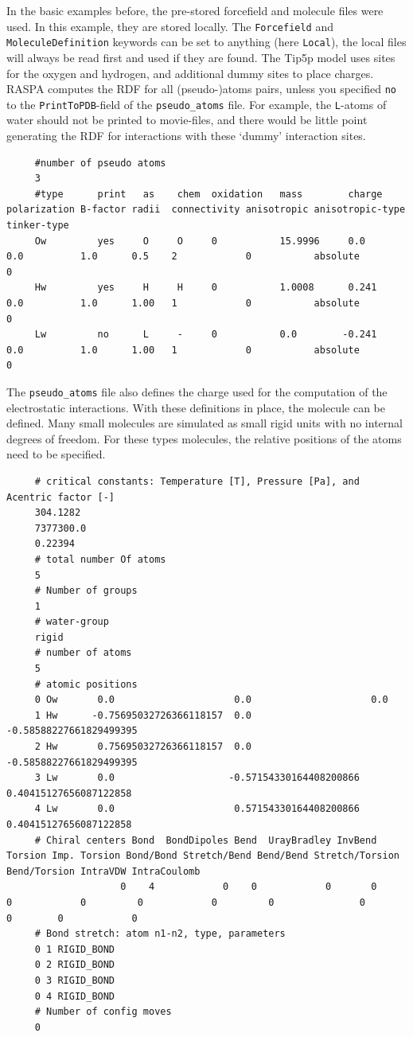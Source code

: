 In the basic examples before, the pre-stored forcefield and molecule files were used.
In this example, they are stored locally. The \verb+Forcefield+ and \verb+MoleculeDefinition+ keywords
can be set to anything (here \verb+Local+), the local files will always be read first and used if they are found.
The Tip5p model uses sites for the oxygen and hydrogen, and additional dummy sites to place charges.
RASPA computes the RDF for all (pseudo-)atoms pairs, 
unless you specified \verb+no+ to the \verb+PrintToPDB+-field of the \verb+pseudo_atoms+ file.
For example, the \verb+L+-atoms of water should not be printed to movie-files, and there would be little point generating
the RDF for interactions with these `dummy' interaction sites.
\begin{tiny}
\begin{verbatim}
     #number of pseudo atoms
     3
     #type      print   as    chem  oxidation   mass        charge   polarization B-factor radii  connectivity anisotropic anisotropic-type   tinker-type
     Ow         yes     O     O     0           15.9996     0.0      0.0          1.0      0.5    2            0           absolute           0
     Hw         yes     H     H     0           1.0008      0.241    0.0          1.0      1.00   1            0           absolute           0
     Lw         no      L     -     0           0.0        -0.241    0.0          1.0      1.00   1            0           absolute           0
\end{verbatim}
\end{tiny}
The \verb+pseudo_atoms+ file also defines the charge used for the computation of the electrostatic interactions.
With these definitions in place, the molecule can be defined. Many small molecules are simulated as small rigid units with no internal degrees of freedom.
For these types molecules, the relative positions of the atoms need to be specified.
\begin{tiny}
\begin{verbatim}
     # critical constants: Temperature [T], Pressure [Pa], and Acentric factor [-]
     304.1282
     7377300.0
     0.22394
     # total number Of atoms
     5
     # Number of groups
     1
     # water-group
     rigid
     # number of atoms
     5
     # atomic positions
     0 Ow       0.0                     0.0                     0.0
     1 Hw      -0.75695032726366118157  0.0                    -0.58588227661829499395
     2 Hw       0.75695032726366118157  0.0                    -0.58588227661829499395
     3 Lw       0.0                    -0.57154330164408200866  0.40415127656087122858
     4 Lw       0.0                     0.57154330164408200866  0.40415127656087122858
     # Chiral centers Bond  BondDipoles Bend  UrayBradley InvBend  Torsion Imp. Torsion Bond/Bond Stretch/Bend Bend/Bend Stretch/Torsion Bend/Torsion IntraVDW IntraCoulomb
                    0    4            0    0            0       0        0            0         0            0         0               0            0        0            0
     # Bond stretch: atom n1-n2, type, parameters
     0 1 RIGID_BOND
     0 2 RIGID_BOND
     0 3 RIGID_BOND
     0 4 RIGID_BOND
     # Number of config moves
     0
\end{verbatim}
\end{tiny}

